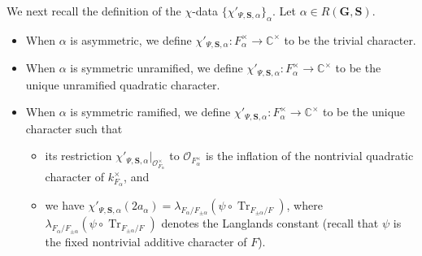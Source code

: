 \documentclass{amsart}
\newcommand{\mcO}{\mathcal{O}}
\newcommand{\C}{\mathbb{C}}
\newcommand{\bfG}{\mathbf{G}}
\newcommand{\bfS}{\mathbf{S}}
\DeclareMathOperator{\Tr}{Tr}
\theoremstyle{plain}
\theoremstyle{definition}
\theoremstyle{remark}
\theoremstyle{theorem}
\begin{document}
We next recall the definition of the $\chi$-data $\{\chi'_{\Psi,\bfS,\alpha}\}_{\alpha}$.
Let $\alpha\in R(\bfG,\bfS)$.
\begin{itemize}
\item
When $\alpha$ is asymmetric, we define $\chi'_{\Psi,\bfS,\alpha}\colon F_{\alpha}^{\times}\rightarrow\C^{\times}$ to be the trivial character.
\item
When $\alpha$ is symmetric unramified, we define $\chi'_{\Psi,\bfS,\alpha}\colon F_{\alpha}^{\times}\rightarrow\C^{\times}$ to be the unique unramified quadratic character.
\item
When $\alpha$ is symmetric ramified, we define $\chi'_{\Psi,\bfS,\alpha}\colon F_{\alpha}^{\times}\rightarrow\C^{\times}$ to be the unique character such that 
\begin{itemize}
\item
its restriction $\chi'_{\Psi,\bfS,\alpha}|_{\mcO_{F_{\alpha}}^{\times}}$ to $\mcO_{F_{\alpha}^{\times}}$ is the inflation of the nontrivial quadratic character of $k_{F_{\alpha}}^{\times}$, and
\item
we have $\chi'_{\Psi,\bfS,\alpha}(2a_{\alpha})=\lambda_{F_{\alpha}/F_{\pm\alpha}}(\psi\circ\Tr_{F_{\pm\alpha}/F})$, where $\lambda_{F_{\alpha}/F_{\pm\alpha}}(\psi\circ\Tr_{F_{\pm\alpha}/F})$ denotes the Langlands constant (recall that $\psi$ is the fixed nontrivial additive character of $F$).
\end{itemize}
\end{itemize}
\end{document}
